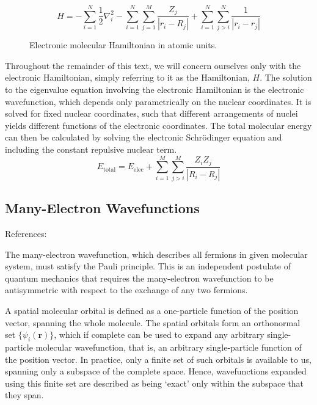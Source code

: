 \begin{figure}[H]
\begin{equation*}
    H =
    - \sum_{i=1}^{N} \frac{1}{2} \nabla^{2}_{i}
    - \sum_{i=1}^{N} \sum_{j=1}^{M} \frac{Z_j}{|r_{i} - R_{j}|}
    + \sum_{i=1}^{N} \sum_{j>i}^{N} \frac{1}{|r_{i} - r_{j}|}
\end{equation*}
\caption{Electronic molecular Hamiltonian in atomic units.}
\end{figure}
Throughout the remainder of this text, we will concern ourselves only with the electronic Hamiltonian, simply referring to it as the Hamiltonian, $H$. The solution to the eigenvalue equation involving the electronic Hamiltonian is the electronic wavefunction, which depends only parametrically on the nuclear coordinates. It is solved for fixed nuclear coordinates, such that different arrangements of nuclei yields different functions of the electronic coordinates. The total molecular energy can then be calculated by solving the electronic Schrödinger equation and including the constant repulsive nuclear term.
\begin{equation*}
    E_\text{total} = E_\text{elec} + \sum_{i=1}^{M} \sum_{j>i}^{M} \frac{Z_{i} Z_{j}}{|R_{i} - R_{j}|}
\end{equation*}

\subsection{\label{many-electron-wavefunctions}Many-Electron Wavefunctions}
References: \cite{Atilla1996}

The many-electron wavefunction, which describes all fermions in given molecular system, must satisfy the Pauli principle. This is an independent postulate of quantum mechanics that requires the many-electron wavefunction to be antisymmetric with respect to the exchange of any two fermions.

A spatial molecular orbital is defined as a one-particle function of the position vector, spanning the whole molecule. The spatial orbitals form an orthonormal set $\{\psi_i(\mathbf{r})\}$, which if complete can be used to expand any arbitrary single-particle molecular wavefunction, that is, an arbitrary single-particle function of the position vector. In practice, only a finite set of such orbitals is available to us, spanning only a subspace of the complete space. Hence, wavefunctions expanded using this finite set are described as being `exact' only within the subspace that they span.

